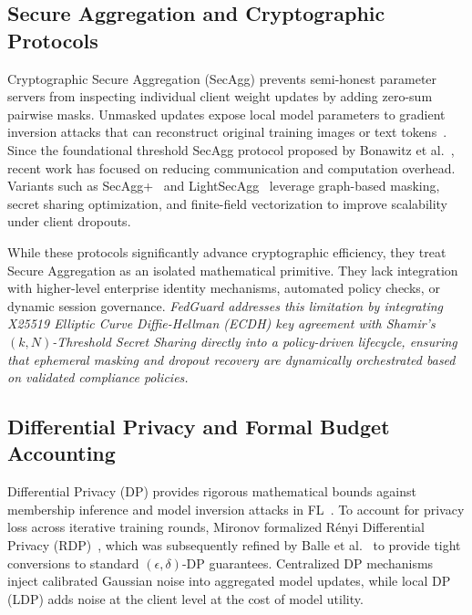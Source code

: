 \subsection{Secure Aggregation and Cryptographic Protocols}

Cryptographic Secure Aggregation (SecAgg) prevents semi-honest parameter servers from inspecting individual client weight updates by adding zero-sum pairwise masks. Unmasked updates expose local model parameters to gradient inversion attacks that can reconstruct original training images or text tokens~\cite{zhu2019deep, geiping2020inverting}. Since the foundational threshold SecAgg protocol proposed by Bonawitz et al.~\cite{bonawitz2017practical}, recent work has focused on reducing communication and computation overhead. Variants such as SecAgg+~\cite{bell2020secagg} and LightSecAgg~\cite{so2021lightsecagg} leverage graph-based masking, secret sharing optimization, and finite-field vectorization to improve scalability under client dropouts.

While these protocols significantly advance cryptographic efficiency, they treat Secure Aggregation as an isolated mathematical primitive. They lack integration with higher-level enterprise identity mechanisms, automated policy checks, or dynamic session governance. \textit{FedGuard addresses this limitation by integrating X25519 Elliptic Curve Diffie-Hellman (ECDH) key agreement with Shamir's $(k, N)$-Threshold Secret Sharing directly into a policy-driven lifecycle, ensuring that ephemeral masking and dropout recovery are dynamically orchestrated based on validated compliance policies.}

\subsection{Differential Privacy and Formal Budget Accounting}

Differential Privacy (DP) provides rigorous mathematical bounds against membership inference and model inversion attacks in FL~\cite{dwork2014algorithmic, shokri2017membership}. To account for privacy loss across iterative training rounds, Mironov formalized R\'enyi Differential Privacy (RDP)~\cite{mironov2017renyi}, which was subsequently refined by Balle et al.~\cite{balle2020hypothesis} to provide tight conversions to standard $(\epsilon, \delta)$-DP guarantees. Centralized DP mechanisms~\cite{abadi2016deep} inject calibrated Gaussian noise into aggregated model updates, while local DP (LDP) adds noise at the client level at the cost of model utility.

